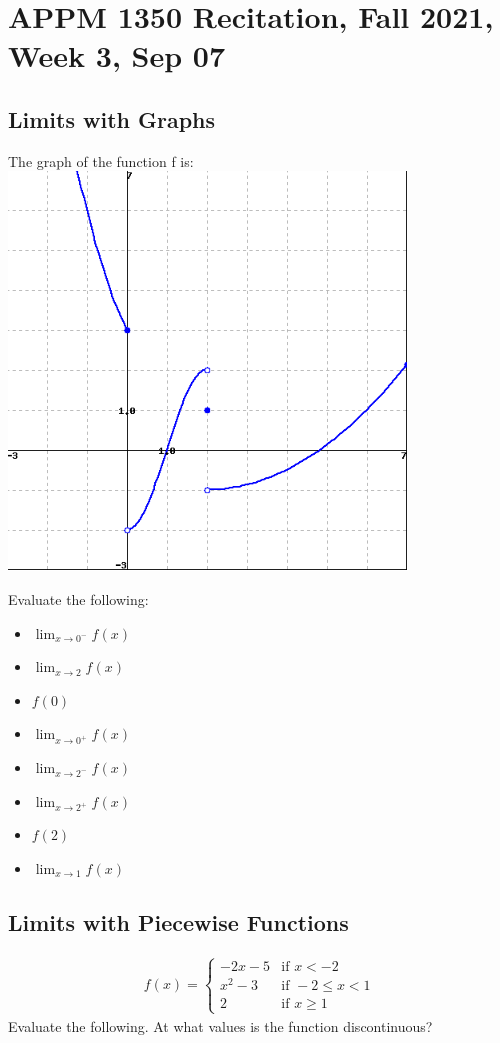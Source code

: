 \documentclass{article}
\begin{document}
\section*{APPM 1350 Recitation, Fall 2021, Week 3, Sep 07}
\vspace{0.5in}

\subsection*{Limits with Graphs}
The graph of the function f is:\\
\includegraphics[scale=0.4]{func}

Evaluate the following:
\setlength{\columnsep}{-2.1in}
\begin{multicols}{2}
	\begin{itemize}
		\item $\lim_{x \rightarrow 0^-} f(x)$
		\item $\lim_{x \rightarrow 2} f(x)$
		\item $f(0)$
		\item $\lim_{x \rightarrow 0^+} f(x)$
		\item $\lim_{x \rightarrow 2^-} f(x)$
		\item $\lim_{x \rightarrow 2^+} f(x)$
		\item $f(2)$
		\item $\lim_{x\to 1} f(x)$
	\end{itemize}
\end{multicols}

\vspace{2cm}
\subsection*{Limits with Piecewise Functions}
\begin{align*}
f(x) = \begin{cases} 
-2x-5 & \text{if } x<-2 \\
x^2-3 & \text{if } -2 \leq x < 1 \\
2 & \text{if } x \geq 1 
\end{cases}
\end{align*}
Evaluate the following. At what values is the function discontinuous? 
\end{document}
